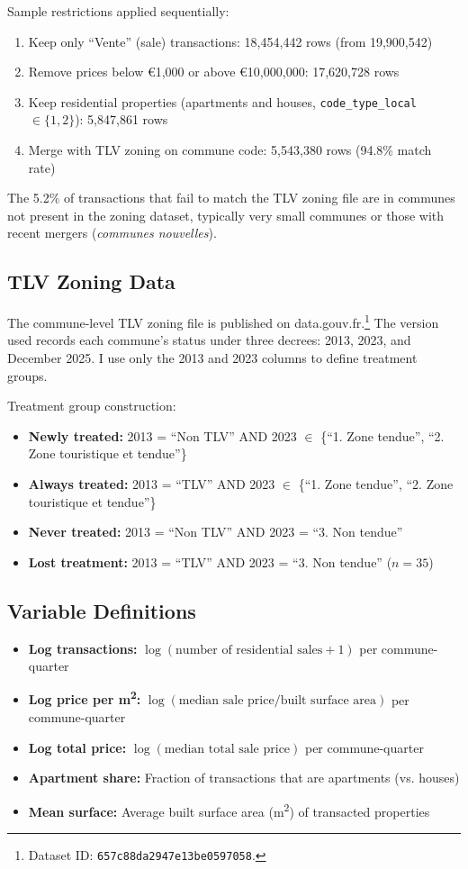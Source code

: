 \documentclass[12pt]{article}
\begin{document}
Sample restrictions applied sequentially:
\begin{enumerate}
\item Keep only ``Vente'' (sale) transactions: 18,454,442 rows (from 19,900,542)
\item Remove prices below \euro{1,000} or above \euro{10,000,000}: 17,620,728 rows
\item Keep residential properties (apartments and houses, \texttt{code\_type\_local} $\in \{1, 2\}$): 5,847,861 rows
\item Merge with TLV zoning on commune code: 5,543,380 rows (94.8\% match rate)
\end{enumerate}

The 5.2\% of transactions that fail to match the TLV zoning file are in communes not present in the zoning dataset, typically very small communes or those with recent mergers (\textit{communes nouvelles}).

\subsection{TLV Zoning Data}

The commune-level TLV zoning file is published on data.gouv.fr.\footnote{Dataset ID: \texttt{657c88da2947e13be0597058}.} The version used records each commune's status under three decrees: 2013, 2023, and December 2025. I use only the 2013 and 2023 columns to define treatment groups.

Treatment group construction:
\begin{itemize}
\item \textbf{Newly treated:} 2013 = ``Non TLV'' AND 2023 $\in$ \{``1. Zone tendue'', ``2. Zone touristique et tendue''\}
\item \textbf{Always treated:} 2013 = ``TLV'' AND 2023 $\in$ \{``1. Zone tendue'', ``2. Zone touristique et tendue''\}
\item \textbf{Never treated:} 2013 = ``Non TLV'' AND 2023 = ``3. Non tendue''
\item \textbf{Lost treatment:} 2013 = ``TLV'' AND 2023 = ``3. Non tendue'' ($n = 35$)
\end{itemize}

\subsection{Variable Definitions}

\begin{itemize}
\item \textbf{Log transactions:} $\log(\text{number of residential sales} + 1)$ per commune-quarter
\item \textbf{Log price per m\textsuperscript{2}:} $\log(\text{median sale price} / \text{built surface area})$ per commune-quarter
\item \textbf{Log total price:} $\log(\text{median total sale price})$ per commune-quarter
\item \textbf{Apartment share:} Fraction of transactions that are apartments (vs. houses)
\item \textbf{Mean surface:} Average built surface area (m\textsuperscript{2}) of transacted properties
\end{itemize}
\end{document}
